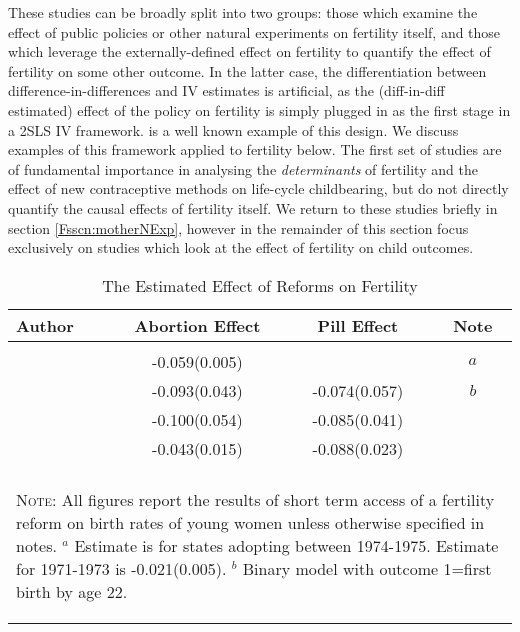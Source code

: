 These studies can be broadly split into two groups: those which examine the
effect of public policies or other natural experiments on fertility itself,
and those which leverage the externally-defined effect on fertility to quantify
the effect of fertility on some other outcome.  In the latter case, the 
differentiation between difference-in-differences and IV estimates is artificial,
as the (diff-in-diff estimated) effect of the policy on fertility is simply 
plugged in as the first stage in a 2SLS IV framework.  \citet{Duflo2001} is a 
well known example of this design.  We discuss examples of this framework applied
to fertility below.  The first set of studies are of fundamental importance in 
analysing the \emph{determinants} of fertility and the effect of new contraceptive 
methods on life-cycle childbearing, but do not directly quantify the causal 
effects of fertility itself.  We return to these studies briefly in section 
\ref{Fsscn:motherNExp}, however in the remainder of this section focus 
exclusively on studies which look at the effect of fertility on child outcomes.

\begin{table}
\caption{The Estimated Effect of Reforms on Fertility}
\begin{tabular}{lccc} \toprule
Author & Abortion Effect & Pill Effect & Note \\ \midrule
\citet{Levineetal1996}        &               &               &      \\
\citet{Gruberetal1999}        & -0.059(0.005) &               & $a$ \\
\citet{Bailey2006}            & -0.093(0.043) & -0.074(0.057) & $b$ \\
\citet{Guldi2008}             & -0.100(0.054) & -0.085(0.041) &      \\
\citet{OltmansHungerman2012}  & -0.043(0.015) & -0.088(0.023) &      \\
& & \\ \bottomrule
\multicolumn{4}{p{11cm}}{\begin{footnotesize}\textsc{Note:} All figures report the
results of short term access of a fertility reform on birth rates of young women 
unless otherwise specified in notes. \newline 
$^a$ Estimate is for states adopting between 1974-1975. Estimate for 1971-1973 is 
-0.021(0.005). \newline
$^b$ Binary model with outcome 1=first birth by age 22.
\end{footnotesize}} \\
\end{tabular}
\end{table}

